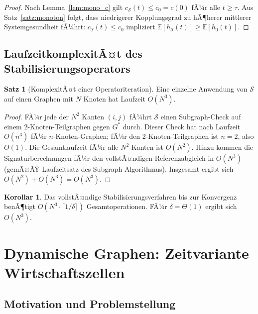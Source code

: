 ﻿\documentclass[a4paper,12pt]{article}
\theoremstyle{definition}
\newtheorem{satz}{Satz}
\newtheorem{korollar}{Korollar}
\begin{document}
\begin{proof}
    Nach Lemma~\ref{lem:mono_c} gilt $c_{\mathcal{S}}(t) \leq c_0 = c(0)$ fÃ¼r alle
    $t \geq \tau$. Aus Satz~\ref{satz:monoton} folgt, dass niedrigerer Kopplungsgrad
    zu hÃ¶herer mittlerer Systemgesundheit fÃ¼hrt: $c_{\mathcal{S}}(t) \leq c_0$ impliziert
    $\mathbb{E}[h_{\mathcal{S}}(t)] \geq \mathbb{E}[h_0(t)]$.
\end{proof}

\subsection{LaufzeitkomplexitÃ¤t des Stabilisierungsoperators}

\begin{satz}[KomplexitÃ¤t einer Operatoriteration]
\label{satz:komplex_op}
    Eine einzelne Anwendung von $\mathcal{S}$ auf einen Graphen mit $N$ Knoten hat
    Laufzeit $O(N^3)$.
\end{satz}

\begin{proof}
    FÃ¼r jede der $N^2$ Kanten $(i,j)$ fÃ¼hrt $\mathcal{S}$ einen Subgraph-Check
    auf einem 2-Knoten-Teilgraphen gegen $G^*$ durch. Dieser Check hat nach
    \citep{epp2026subgraph} Laufzeit $O(n^3)$ fÃ¼r $n$-Knoten-Graphen; fÃ¼r
    den 2-Knoten-Teilgraphen ist $n=2$, also $O(1)$. Die Gesamtlaufzeit fÃ¼r
    alle $N^2$ Kanten ist $O(N^2)$. Hinzu kommen die Signaturberechnungen
    fÃ¼r den vollstÃ¤ndigen Referenzabgleich in $O(N^3)$ (gemÃ¤ÃŸ Laufzeitsatz des
    Subgraph Algorithmus). Insgesamt ergibt sich $O(N^2) + O(N^3) = O(N^3)$.
\end{proof}

\begin{korollar}
    Das vollstÃ¤ndige Stabilisierungsverfahren bis zur Konvergenz benÃ¶tigt
    $O(N^3 \cdot \lceil 1/\delta \rceil)$ Gesamtoperationen. FÃ¼r $\delta = \Theta(1)$
    ergibt sich $O(N^3)$.
\end{korollar}

\section{Dynamische Graphen: Zeitvariante Wirtschaftszellen}
\label{sec:dynGraph}

\subsection{Motivation und Problemstellung}
\end{document}
